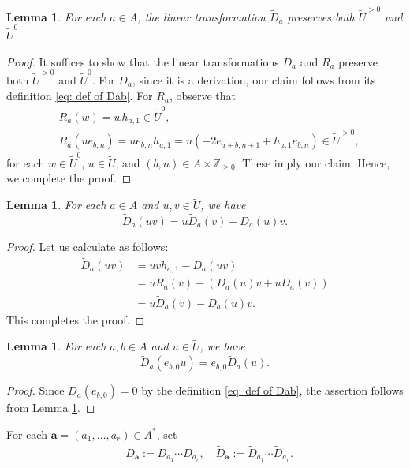 \documentclass[12pt,a4paper]{amsart}
\newtheorem{lem}[thm]{Lemma}
\theoremstyle{definition}
\numberwithin{equation}{subsection}
\begin{document}
\begin{lem}\label{lem: tilD preserves tilUpos}
  For each $a \in A$, the linear transformation $\tilde{D}_a$ preserves both $\tilde{U}^{> 0}$ and $\tilde{U}^0$.
\end{lem}
\begin{proof}
  It suffices to show that the linear transformations $D_a$ and $R_a$ preserve both $\tilde{U}^{> 0}$ and $\tilde{U}^0$.
  For $D_a$, since it is a derivation, our claim follows from its definition \eqref{eq: def of Dab}.
  For $R_a$, observe that
  \begin{align*}
    &R_{a}(w) = w h_{a,1} \in \tilde{U}^0,\\
    &R_a(ue_{b,n}) = ue_{b,n}h_{a,1} = u(-2e_{a+b,n+1} + h_{a,1}e_{b,n}) \in \tilde{U}^{>0},
  \end{align*}
  for each $w \in \tilde{U}^0$, $u \in \tilde{U}$, and $(b,n) \in A \times \mathbb{Z}_{\geq 0}$.
  These imply our claim.
  Hence, we complete the proof.
\end{proof}

\begin{lem}\label{lem: tilDa(uv)}
  For each $a \in A$ and $u,v \in \tilde{U}$, we have
  \[
    \tilde{D}_a(uv) = u \tilde{D}_a(v) - D_a(u)v.
  \]
\end{lem}
\begin{proof}
  Let us calculate as follows:
  \begin{align*}
    \tilde{D}_a(uv)
    &= uvh_{a,1} - D_a(uv)\\
    &= u R_a(v) - (D_a(u)v + u D_a(v))\\
    &= u \tilde{D}_a(v) - D_a(u)v.
  \end{align*}
  This completes the proof.
\end{proof}

\begin{lem}\label{lem: comm tilD e}
  For each $a,b \in A$ and $u \in \tilde{U}$, we have
  \[
    \tilde{D}_{a}(e_{b,0} u) = e_{b,0} \tilde{D}_{a}(u).
  \]
\end{lem}
\begin{proof}
  Since $D_a(e_{b,0}) = 0$ by the definition \eqref{eq: def of Dab}, the assertion follows from Lemma \ref{lem: tilDa(uv)}.
\end{proof}

For each $\mathbf{a} = (a_1,\dots,a_r) \in A^*$, set
\begin{align}\label{eq: def of Dbfa, Dtilbfa}
  &D_{\mathbf{a}} := D_{a_1} \cdots D_{a_r}, \quad \tilde{D}_{\mathbf{a}} := \tilde{D}_{a_1} \cdots \tilde{D}_{a_r}.
\end{align}
\end{document}
